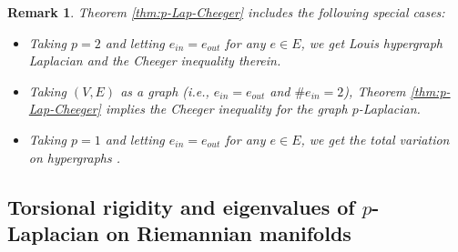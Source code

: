 \documentclass[12pt,a4paper]{article}
\newtheorem{remark}[theorem]{Remark}
\begin{document}
\begin{remark}\label{remark:p-Lap-} %
Theorem \ref{thm:p-Lap-Cheeger} includes the following special cases: 
\begin{itemize}
\item Taking $p=2$ and letting  $e_{in}=e_{out}$ for any $e\in E$, we get Louis hypergraph Laplacian  \cite{Louis15} and the Cheeger inequality therein. 
\item Taking $(V,E)$ as a graph (i.e., $e_{in}=e_{out}$ and $\#e_{in}=2$),  Theorem \ref{thm:p-Lap-Cheeger} implies the Cheeger inequality for the graph $p$-Laplacian. 
\item Taking $p=1$ and letting  $e_{in}=e_{out}$ for any $e\in E$, we get the total variation on hypergraphs  \cite{TVhyper-13}.
\end{itemize}
\end{remark}



\subsection{Torsional rigidity and eigenvalues of $p$-Laplacian on Riemannian manifolds}\label{subsec:pLap-monotonicity}
\end{document}
